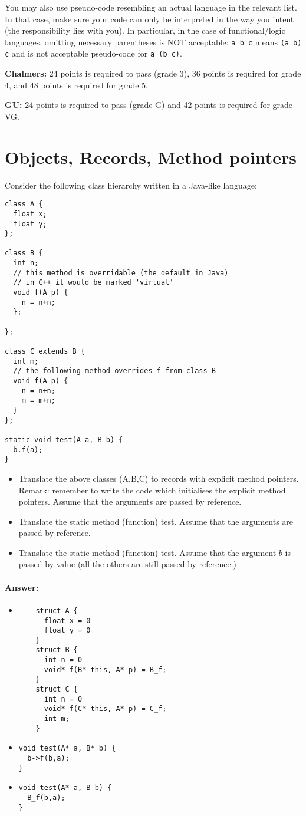 \documentclass{article}
\newcommand{\answer}[0]{\paragraph{Answer:}}
\begin{document}
You may also use pseudo-code resembling an actual language in the
relevant list. In that case, make sure your code can only be
interpreted in the way you intent (the responsibility lies with
you). In particular, in the case of functional/logic languages,
omitting necessary parentheses is NOT acceptable: \texttt{a b c} means
\texttt{(a b) c} and is not acceptable pseudo-code for \texttt{a (b
  c)}.


\textbf{Chalmers:}
24 points is required to pass (grade 3), 36 points is required for
grade 4, and 48 points is required for grade 5.

\textbf{GU:}
24 points is required to pass (grade G) and 42 points is
required for grade VG.

\section{Objects, Records, Method pointers}
Consider the following class hierarchy written in a Java-like
language:
\begin{verbatim}
class A {
  float x;
  float y;
};

class B {
  int n;
  // this method is overridable (the default in Java)
  // in C++ it would be marked 'virtual'
  void f(A p) {
    n = n+n;
  };

};

class C extends B {
  int m;
  // the following method overrides f from class B
  void f(A p) {
    n = n+n;
    m = m+n;
  }
};

static void test(A a, B b) {
  b.f(a);
}
\end{verbatim}

\begin{itemize}
\item Translate the above classes (A,B,C) to records with explicit method
  pointers.  Remark: remember to write the code which initialises the
  explicit method pointers. Assume that the arguments are passed by
  reference.  
\item Translate the static method (function) test. Assume that the
  arguments are passed by reference.  
\item Translate the static method (function) test. Assume that the
  argument $b$ is passed by value (all the others are still passed by
  reference.)  
\end{itemize}

\answer{
\begin{itemize}
\item 
\begin{verbatim}
    struct A {
      float x = 0
      float y = 0
    }
    struct B {
      int n = 0
      void* f(B* this, A* p) = B_f;
    }
    struct C {
      int n = 0
      void* f(C* this, A* p) = C_f;
      int m;
    }
\end{verbatim}
\item
\begin{verbatim}
void test(A* a, B* b) {
  b->f(b,a);
}
\end{verbatim}
\item
\begin{verbatim}
void test(A* a, B b) {
  B_f(b,a);
}
\end{verbatim}
\end{itemize}
}
\newpage
\end{document}
